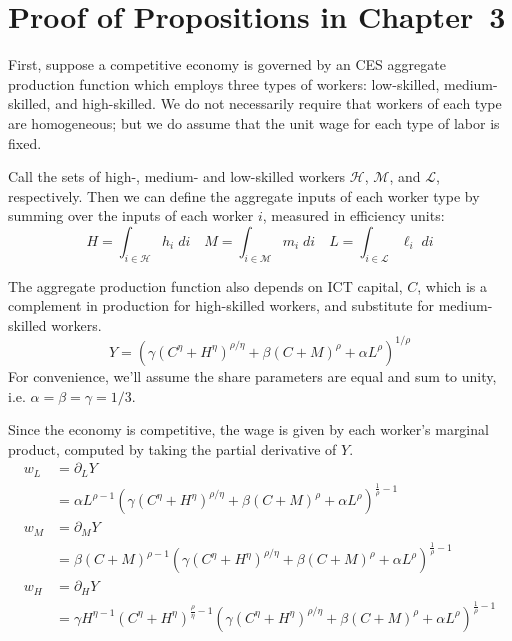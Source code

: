 \chapter{Proof of Propositions in Chapter~3}

\newcommand{\ELL}{\mathcal{L}}
\newcommand{\EH}{\mathcal{H}}
\newcommand{\M}{\mathcal{M}}

First, suppose a competitive economy is governed by an CES aggregate production function which employs three types of workers: low-skilled, medium-skilled, and high-skilled. We do not necessarily require that workers of each type are homogeneous; but we do assume that the unit wage for each type of labor is fixed. 

Call the sets of high-, medium- and low-skilled workers $\EH$, $\M$, and $\ELL$, respectively. Then we can define the aggregate inputs of each worker type by summing over the inputs of each worker $i$, measured in efficiency units:
$$ H = \int_{i\in\EH}h_i\;di\quad 
     M = \int_{i\in\M}m_i\;di\quad
     L = \int_{i\in\ELL}\ell_i\;di $$

The aggregate production function also depends on ICT capital, $C$, which is a complement in production for high-skilled workers, and substitute for medium-skilled workers.
\begin{equation}\label{eq:prod}
Y =\left(\gamma  \left(C^{\eta }+H^{\eta }\right)^{\rho /\eta }+\beta  (C+M)^{\rho }+\alpha  L^{\rho }\right)^{1/\rho }
\end{equation}
For convenience, we'll assume the share parameters are equal and sum to unity, i.e. $\alpha=\beta=\gamma=1/3$.

Since the economy is competitive, the wage is given by each worker's marginal product, computed by taking the partial derivative of $Y$.
\begin{align*}
w_L &= \partial_LY \\
    &= \alpha  L^{\rho -1} \left(\gamma  \left(C^{\eta }+H^{\eta }\right)^{\rho /\eta }+\beta  (C+M)^{\rho }+\alpha  L^{\rho }\right)^{\frac{1}{\rho }-1} \\
w_M &= \partial_MY \\
    &= \beta  (C+M)^{\rho -1} \left(\gamma  \left(C^{\eta }+H^{\eta }\right)^{\rho /\eta }+\beta  (C+M)^{\rho }+\alpha  L^{\rho }\right)^{\frac{1}{\rho }-1} \\
w_H &= \partial_HY \\
    &= \gamma  H^{\eta -1} \left(C^{\eta }+H^{\eta }\right)^{\frac{\rho }{\eta }-1} \left(\gamma  \left(C^{\eta }+H^{\eta }\right)^{\rho /\eta }+\beta  (C+M)^{\rho }+\alpha  L^{\rho }\right)^{\frac{1}{\rho }-1}
\end{align*}

